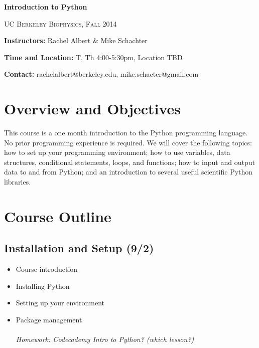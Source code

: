 \documentclass[12pt]{article}
\begin{document}
\thispagestyle{plain} %






\begin{center}
\LARGE{\bf{Introduction to Python}}

\textsc{UC Berkeley Biophysics, Fall 2014} \bigskip

\end{center}

\noindent\textbf{Instructors: }Rachel Albert \& Mike Schachter\medskip

\noindent\textbf{Time and Location:} T, Th 4:00-5:30pm, Location TBD\medskip

\noindent\textbf{Contact:} rachelalbert@berkeley.edu, mike.schacter@gmail.com\medskip

\bigskip

\section*{Overview and Objectives}%
This course is a one month introduction to the Python programming language. No prior programming experience is required. We will cover the following topics: how to set up your programming environment; how to use variables, data structures, conditional statements, loops, and functions; how to input and output data to and from Python; and an introduction to several useful scientific Python libraries.

\section*{Course Outline}

\subsection*{Installation and Setup \textnormal{\small{(9/2)} }}
\begin{itemize}
\item Course introduction
\item Installing Python
\item Setting up your environment
\item Package management \\\\
\it{Homework: Codecademy Intro to Python? (which lesson?)}
\end{itemize}
\end{document}
